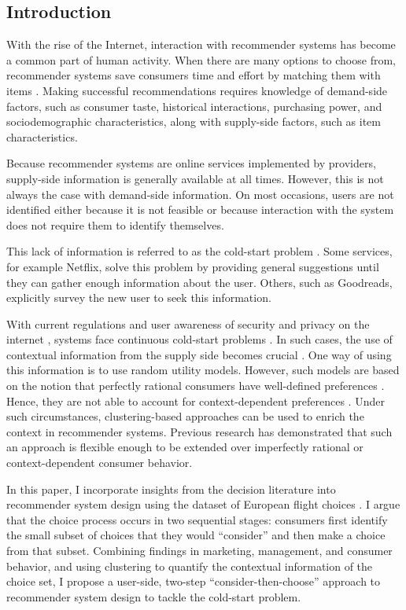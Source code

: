 \documentclass[a4paper,12pt]{article}
\begin{document}
\subsection{Introduction}

With the rise of the Internet, interaction with recommender systems has become a common part of human activity. When there are many options to choose from, recommender systems save consumers time and effort by matching them with items \citep{bobadilla2013recommender}. Making successful recommendations requires knowledge of demand-side factors, such as consumer taste, historical interactions, purchasing power, and sociodemographic characteristics, along with supply-side factors, such as item characteristics.

Because recommender systems are online services implemented by providers, supply-side information is generally available at all times. However, this is not always the case with demand-side information. On most occasions, users are not identified either because it is not feasible or because interaction with the system does not require them to identify themselves.

This lack of information is referred to as the cold-start problem \citep{adomavicius2005toward}. Some services, for example Netflix, solve this problem by providing general suggestions until they can gather enough information about the user. Others, such as Goodreads, explicitly survey the new user to seek this information.

With current regulations and user awareness of security and privacy on the internet \citep{anton2010internet}, systems face continuous cold-start problems \citep{wong2014online}. In such cases, the use of contextual information from the supply side becomes crucial \citep{adomavicius2005toward}. One way of using this information is to use random utility models. However, such models are based on the notion that perfectly rational consumers have well-defined preferences \citep{babutsidze2019asymmetric}. Hence, they are not able to account for context-dependent preferences \citep{tversky1979preference}. Under such circumstances, clustering-based approaches can be used to enrich the context in recommender systems. Previous research \citep{babutsidze2019asymmetric} has demonstrated that such an approach is flexible enough to be extended over imperfectly rational or context-dependent consumer behavior.

In this paper, I incorporate insights from the decision literature into recommender system design using the dataset of European flight choices \citep{lheritier2019airline}. I argue that the choice process occurs in two sequential stages: consumers first identify the small subset of choices that they would ``consider'' and then make a choice from that subset. Combining findings in marketing, management, and consumer behavior, and using clustering to quantify the contextual information of the choice set,  I propose a user-side, two-step  ``consider-then-choose'' \citep{gilbride2004choice,liu2011efficient} approach to recommender system design to tackle the cold-start problem. 
\end{document}
